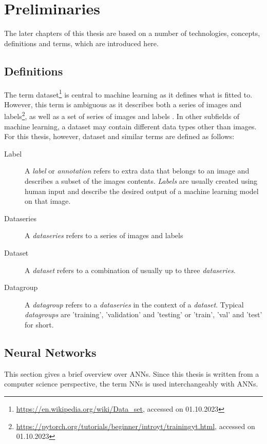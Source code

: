 \documentclass[10pt]{book}
\begin{document}
\chapter{Preliminaries}
\label{chap:prelim}

The later chapters of this thesis are based on a number of technologies, concepts, definitions and terms, which are introduced here.

\section{Definitions}

The term dataset\footnote{\url{https://en.wikipedia.org/wiki/Data_set}, accessed on 01.10.2023} is central to machine learning as it defines what is fitted to. However, this term is ambiguous as it describes both a series of images and labels\footnote{\url{https://pytorch.org/tutorials/beginner/introyt/trainingyt.html}, accessed on 01.10.2023}, as well as a set of series of images and labels \cite{lin2014microsoft}. In other subfields of machine learning, a dataset may contain different data types other than images. For this thesis, however, dataset and similar terms are defined as follows:

\begin{description}
  \item[Label] A \textit{label} or \textit{annotation} refers to extra data that belongs to an image and describes a subset of the images contents. \textit{Labels} are usually created using human input and describe the desired output of a machine learning model on that image.
  \item[Dataseries] A \textit{dataseries} refers to a series of images and labels
  \item[Dataset] A \textit{dataset} refers to a combination of usually up to three \textit{dataseries}.
  \item[Datagroup] A \textit{datagroup} refers to a \textit{dataseries} in the context of a \textit{dataset}. Typical \textit{datagroups} are 'training', 'validation' and 'testing' or 'train', 'val' and 'test' for short.
\end{description}

\section{Neural Networks}

This section gives a brief overview over \acp{ANN}. Since this thesis is written from a computer science perspective, the term \acp{NN} is used interchangeably with \acp{ANN}.
\end{document}
